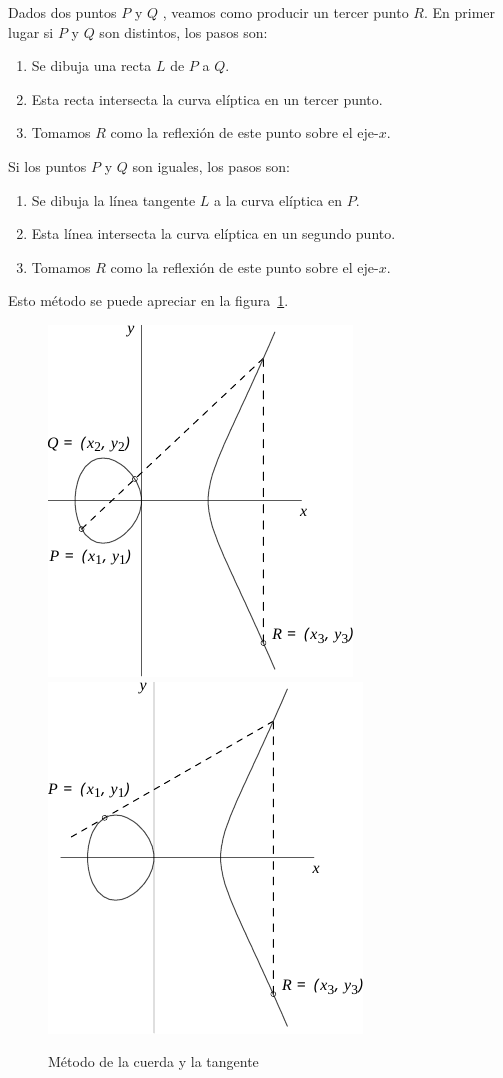\begin{algoritmo}
	Dados dos puntos $P$ y $Q$ , veamos como producir un tercer punto $R$. En primer lugar si $P$ y $Q$ son distintos, los pasos son:
	\begin{enumerate}
		\item Se dibuja una recta $L$ de $P$ a $Q$.
		\item Esta recta intersecta la curva elíptica en un tercer punto.
		\item Tomamos $R$ como la reflexión de este punto sobre el eje-$x$.
	\end{enumerate}
	Si los puntos $P$ y $Q$ son iguales, los pasos son:
	\begin{enumerate}
		\item Se dibuja la línea tangente $L$ a la curva elíptica en $P$.
		\item Esta línea intersecta la curva elíptica en un segundo punto.
		\item Tomamos $R$ como la reflexión de este punto sobre el eje-$x$.
	\end{enumerate}
	Esto método se puede apreciar en la figura~\ref{fig:Método de la cuerda y la tangente}.
\end{algoritmo}

\begin{figure}[h]
  \myfloatalign
  {\includegraphics[width=.45\linewidth]{gfx/ejemplo_adiccion.pdf}}
  \quad
  {\includegraphics[width=.45\linewidth]{gfx/ejemplo_duplicacion.pdf}}
  \caption{Método de la cuerda y la tangente}\label{fig:Método de la cuerda y la tangente}
\end{figure}

